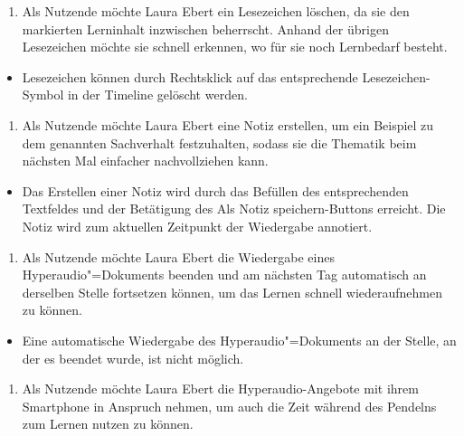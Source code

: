 \vspace{0.25cm}
\begin{enumerate}[resume*]
\item \label{US-Lesezeichen-Loeschen-Eval} Als Nutzende möchte Laura Ebert ein Lesezeichen löschen, da sie den markierten Lerninhalt inzwischen beherrscht. Anhand der übrigen Lesezeichen möchte sie schnell erkennen, wo für sie noch Lernbedarf besteht.
\end{enumerate}
\vspace{-0.1cm}
\begin{itemize}
\item[\Checkmark]
Lesezeichen können durch Rechtsklick auf das entsprechende Lesezeichen-Symbol in der Timeline gelöscht werden.
\end{itemize}
\vspace{0.25cm}
\begin{enumerate}[resume*]
\item \label{US-Notiz-S-Eval} Als Nutzende möchte Laura Ebert eine Notiz erstellen, um ein Beispiel zu dem genannten Sachverhalt festzuhalten, sodass sie die Thematik beim nächsten Mal einfacher nachvollziehen kann.
\end{enumerate}
\vspace{-0.1cm}
\begin{itemize}
\item[\Checkmark]
Das Erstellen einer Notiz wird durch das Befüllen des entsprechenden Textfeldes und der Betätigung des \glqq Als Notiz speichern\grqq{}-Buttons erreicht. Die Notiz wird zum aktuellen Zeitpunkt der Wiedergabe annotiert.
\end{itemize}
\vspace{0.25cm}
\begin{enumerate}[resume*]
\item \label{US-Fortsetzen-Eval} Als Nutzende möchte Laura Ebert die Wiedergabe eines Hyperaudio"=Dokuments beenden und am nächsten Tag automatisch an derselben Stelle fortsetzen können, um das Lernen schnell wiederaufnehmen zu können.
\end{enumerate}
\vspace{-0.1cm}
\begin{itemize}
\item[\XSolidBrush]
Eine automatische Wiedergabe des Hyperaudio"=Dokuments an der Stelle, an der es beendet wurde, ist nicht möglich.
\end{itemize}
\vspace{0.25cm}
\begin{enumerate}[resume*]
\item \label{US-Mobil-Eval} Als Nutzende möchte Laura Ebert die Hyperaudio-Angebote mit ihrem Smartphone in Anspruch nehmen, um auch die Zeit während des Pendelns zum Lernen nutzen zu können.
\end{enumerate}
